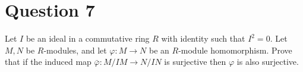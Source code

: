 \section{Question 7}

\begin{question}
    Let $I$ be an ideal in a commutative ring $R$ with identity such that $I^2=0$. Let $M, N$ be $R$-modules, and let $\varphi: M \rightarrow N$ be an $R$-module homomorphism. Prove that if the induced map $\bar{\varphi}: M / I M \rightarrow N / I N$ is surjective then $\varphi$ is also surjective.
\end{question}

\begin{answer}
    
\end{answer}